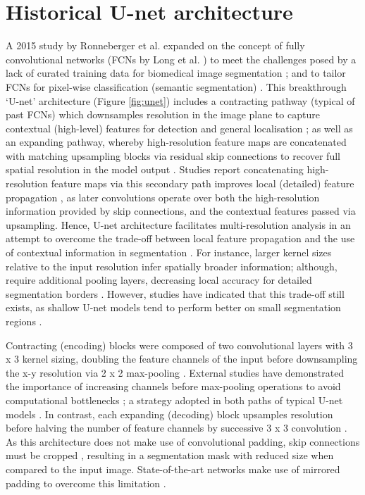\section{Historical U-net architecture}
A 2015 study by Ronneberger et al. expanded on the concept of fully convolutional networks (FCNs by Long et al. \cite{Long2014}) to meet the challenges posed by a lack of curated training data for biomedical image segmentation \cite{Ronneberger_2015}; and to tailor FCNs for pixel-wise classification (semantic segmentation) \cite{DLINMI2018}. This breakthrough `U-net' architecture (Figure \ref{fig:unet}) includes a contracting pathway (typical of past FCNs) which downsamples resolution in the image plane to capture contextual (high-level) features for detection and general localisation \cite{Nemoto_2020}; as well as an expanding pathway, whereby high-resolution feature maps are  concatenated with matching upsampling blocks via residual skip connections \cite{Maier2019} to recover full spatial resolution in the model output \cite{DLINMI2018}. Studies report concatenating high-resolution feature maps via this secondary path improves local (detailed) feature propagation \cite{Nemoto_2020}, as later convolutions operate over both the high-resolution information provided by skip connections, and the contextual features passed via upsampling. Hence, U-net architecture facilitates multi-resolution analysis \cite{Maier2019} in an attempt to overcome the trade-off between local feature propagation and the use of contextual information in segmentation \cite{Hesamian2019}. For instance, larger kernel sizes relative to the input resolution infer spatially broader information; although, require additional pooling layers, decreasing local accuracy for detailed segmentation borders \cite{Hesamian2019} . However, studies have indicated that this trade-off still exists, as shallow U-net models tend to perform better on small segmentation regions \cite{Zhu_2018}.

Contracting (encoding) blocks were composed of two convolutional layers with 3 x 3 kernel sizing, doubling the feature channels of the input before downsampling the x-y resolution via 2 x 2 max-pooling \cite{Ronneberger_2015}. External studies have demonstrated the importance of increasing channels before max-pooling operations to avoid computational bottlenecks \cite{szegedy2015}; a strategy adopted in both paths of typical U-net models \cite{szegedy2015}. In contrast, each expanding (decoding) block upsamples resolution before halving the number of feature channels by successive  3 x 3 convolution \cite{Ronneberger_2015}. As this architecture does not make use of convolutional padding, skip connections must be cropped \cite{Ronneberger_2015}, resulting in a segmentation mask with reduced size when compared to the input image. State-of-the-art networks make use of mirrored padding to overcome this limitation \cite{Nikolov_2018}.

